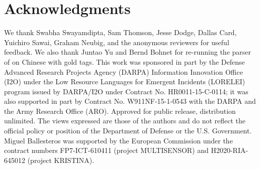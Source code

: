 \documentclass[11pt,letterpaper]{article}
\begin{document}
\section*{Acknowledgments}
We thank Swabha Swayamdipta, Sam Thomson, Jesse Dodge, Dallas Card, Yuichiro Sawai, Graham Neubig, and the anonymous reviewers for useful feedback. We also thank Juntao Yu and Bernd Bohnet for re-running the parser of  on Chinese with gold tags. This work was sponsored in part by the Defense Advanced Research Projects Agency (DARPA) Information Innovation Office (I2O) under the Low Resource Languages for Emergent Incidents (LORELEI) program issued by DARPA/I2O under Contract No. HR0011-15-C-0114; it was also supported in part by Contract No. W911NF-15-1-0543 with the DARPA and the Army Research Office (ARO). Approved for public release, distribution unlimited. The views expressed are those of the authors and do not reflect the official policy or position of the Department of Defense or the U.S. Government. Miguel Ballesteros was supported by the European Commission under the contract numbers FP7-ICT-610411 (project MULTISENSOR) and H2020-RIA-645012 (project KRISTINA).







\end{document}
